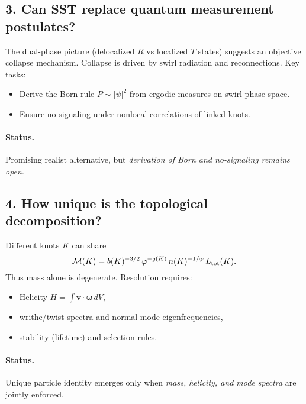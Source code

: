 \documentclass[11pt]{article}
\begin{document}
        \subsection*{3. Can SST replace quantum measurement postulates?}

        The dual-phase picture (delocalized $R$ vs localized $T$ states) suggests an objective collapse mechanism. Collapse is driven by swirl radiation and reconnections.
        Key tasks:
        \begin{itemize}
        \item Derive the Born rule $P\sim|\psi|^2$ from ergodic measures on swirl phase space.
        \item Ensure no-signaling under nonlocal correlations of linked knots.
        \end{itemize}

        \paragraph{Status.} Promising realist alternative, but \emph{derivation of Born and no-signaling remains open}.

        \subsection*{4. How unique is the topological decomposition?}

        Different knots $K$ can share
        \[
            \mathcal M(K)=b(K)^{-3/2}\,\varphi^{-g(K)}\,n(K)^{-1/\varphi}\,L_{\rm tot}(K).
        \]
        Thus mass alone is degenerate. Resolution requires:
        \begin{itemize}
        \item Helicity $H=\int \mathbf v\!\cdot\!\boldsymbol\omega\,dV$,
        \item writhe/twist spectra and normal-mode eigenfrequencies,
        \item stability (lifetime) and selection rules.
        \end{itemize}

        \paragraph{Status.} Unique particle identity emerges only when \emph{mass, helicity, and mode spectra} are jointly enforced.
\end{document}
